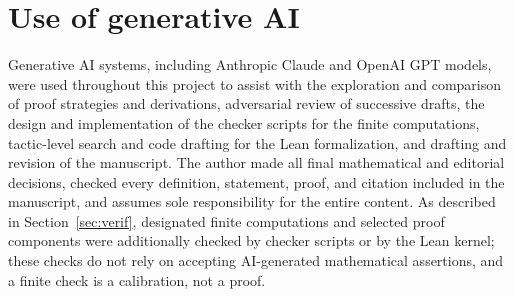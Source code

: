 \documentclass[11pt]{amsart}
\theoremstyle{definition}
\begin{document}
\section*{Use of generative AI}
Generative AI systems, including Anthropic Claude and OpenAI GPT models, were used throughout this project to assist with
the exploration and comparison of proof strategies and derivations, adversarial review of successive drafts, the design and
implementation of the checker scripts for the finite computations, tactic-level search and code drafting for the Lean
formalization, and drafting and revision of the manuscript. The author made all final mathematical and editorial decisions,
checked every definition, statement, proof, and citation included in the manuscript, and assumes sole responsibility for the
entire content. As described in Section~\ref{sec:verif}, designated finite computations and selected proof components were
additionally checked by checker scripts or by the Lean kernel; these checks do not rely on accepting AI-generated
mathematical assertions, and a finite check is a calibration, not a proof.

\appendix



\end{document}
